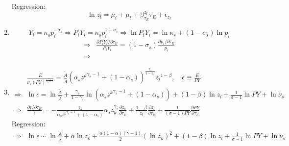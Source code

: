\documentclass[12pt]{article} %
\begin{document}
\begin{enumerate}
    Regression:
    \begin{equation*}
        \ln z_l = \mu_i + \mu_t + \beta_{\tau_E}^{z_l} \tau_E + \epsilon_{z_l}
    \end{equation*}
    \item 
    \begin{equation*}
        Y_i = \kappa_s p_i^{-\sigma_s} \Rightarrow P_iY_i = \kappa_s p_i^{1-\sigma_s} \Rightarrow \ln P_iY_i = \ln \kappa_s + (1-\sigma_s) \ln p_i
    \end{equation*}
    \begin{equation*}
        \begin{split}
            \Rightarrow & \frac{\partial P_iY_i/\partial\tau_E}{P_iY_i} = (1-\sigma_s) \frac{\partial p_i/\partial\tau_E}{p_i} \\
            \Rightarrow & 
        \end{split}
    \end{equation*}
    \item 
    \begin{equation*}
        \begin{split}
            & \frac{E}{\nu_{s}(PY)^{\frac{\sigma_s}{\sigma_s - 1}}}  = \frac{\tilde{A}}{\hat{A}}\left(
                \alpha_s {{z^k}}^{\gamma_s - 1} + (1-\alpha_s)
            \right) ^ {\frac{\gamma_s}{1-\gamma_s}} {{z_l}}^{1 - \beta} , \quad \epsilon \equiv  \frac{E}{PY}\\
            \Rightarrow & \ln \epsilon =  \ln \frac{\tilde{A}}{\hat{A}} + \frac{\gamma_s}{1-\gamma_s} \ln \left(
                \alpha_s {{z^k}}^{\gamma_s - 1} + (1-\alpha_s)
            \right) + (1-\beta) \ln {{z_l}} + \frac{1}{\sigma -1} \ln PY + \ln \nu_{s} \\
            \Rightarrow & \frac{\partial \epsilon/\partial \tau_E}{\epsilon} =  -\frac{\gamma_s}{\alpha_s {{z^k}}^{\gamma_s - 1} + (1-\alpha_s)} {\alpha_s z_k^{\gamma_s}} \frac{\partial z_k}{\partial \tau_E} + \frac{1-\beta}{z_l} \frac{\partial z_l}{\partial \tau_E} + \frac{1}{(\sigma -1)PY} \frac{\partial PY}{\partial \tau_E}
        \end{split}
    \end{equation*}
    Regression:
    \begin{equation*}
        \begin{split}
            \Rightarrow &\ln \epsilon \sim \ln \frac{\tilde{A}}{\hat{A}} + \alpha \ln z_k + \frac{\alpha(1-\alpha)(\gamma-1)}{2} (\ln z_k)^2 + (1-\beta) \ln {{z_l}} + \frac{1}{\sigma -1} \ln PY + \ln \nu_{s} \\

\end{split}
\end{equation*}
\end{enumerate}
\end{document}
